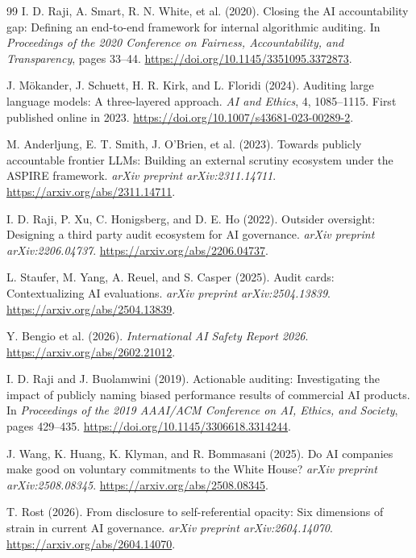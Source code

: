 \documentclass{article}
\begin{document}
\begin{thebibliography}{99}
I. D. Raji, A. Smart, R. N. White, et al. (2020).
Closing the AI accountability gap: Defining an end-to-end framework for internal algorithmic auditing.
In \emph{Proceedings of the 2020 Conference on Fairness, Accountability, and Transparency}, pages 33--44.
\url{https://doi.org/10.1145/3351095.3372873}.

J. Mökander, J. Schuett, H. R. Kirk, and L. Floridi (2024).
Auditing large language models: A three-layered approach.
\emph{AI and Ethics}, 4, 1085--1115. First published online in 2023.
\url{https://doi.org/10.1007/s43681-023-00289-2}.

M. Anderljung, E. T. Smith, J. O'Brien, et al. (2023).
Towards publicly accountable frontier LLMs: Building an external scrutiny ecosystem under the ASPIRE framework.
\emph{arXiv preprint arXiv:2311.14711}.
\url{https://arxiv.org/abs/2311.14711}.

I. D. Raji, P. Xu, C. Honigsberg, and D. E. Ho (2022).
Outsider oversight: Designing a third party audit ecosystem for AI governance.
\emph{arXiv preprint arXiv:2206.04737}.
\url{https://arxiv.org/abs/2206.04737}.

L. Staufer, M. Yang, A. Reuel, and S. Casper (2025).
Audit cards: Contextualizing AI evaluations.
\emph{arXiv preprint arXiv:2504.13839}.
\url{https://arxiv.org/abs/2504.13839}.

Y. Bengio et al. (2026).
\emph{International AI Safety Report 2026}.
\url{https://arxiv.org/abs/2602.21012}.

I. D. Raji and J. Buolamwini (2019).
Actionable auditing: Investigating the impact of publicly naming biased performance results of commercial AI products.
In \emph{Proceedings of the 2019 AAAI/ACM Conference on AI, Ethics, and Society}, pages 429--435.
\url{https://doi.org/10.1145/3306618.3314244}.

J. Wang, K. Huang, K. Klyman, and R. Bommasani (2025).
Do AI companies make good on voluntary commitments to the White House?
\emph{arXiv preprint arXiv:2508.08345}.
\url{https://arxiv.org/abs/2508.08345}.

T. Rost (2026).
From disclosure to self-referential opacity: Six dimensions of strain in current AI governance.
\emph{arXiv preprint arXiv:2604.14070}.
\url{https://arxiv.org/abs/2604.14070}.

\end{thebibliography}
\end{document}
